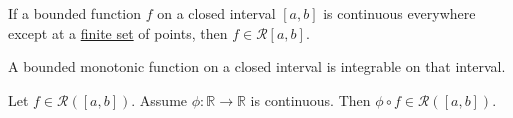   \begin{corollary}
    \label{thm:integrability-of-discontinuous-functions}
    If a bounded function $f$ on a closed interval $[a, b]$ is continuous everywhere except at a \hyperref[st-def:finite-set]{finite set} of points, then $f \in \mathcal{R}[a, b]$. 
  \end{corollary}

  \begin{corollary}
    \label{thm:integrability-of-monotonic-functions}
    A bounded monotonic function on a closed interval is integrable on that interval. 
  \end{corollary} 

  \begin{theorem}
    \label{thm:continuous-compositions-of-integrable-functions}
    Let $f \in \mathcal{R}([a, b])$. Assume $\phi: \mathbb{R} \to \mathbb{R}$ is continuous. Then $\phi \circ f \in \mathcal{R}([a, b])$. 
  \end{theorem}
